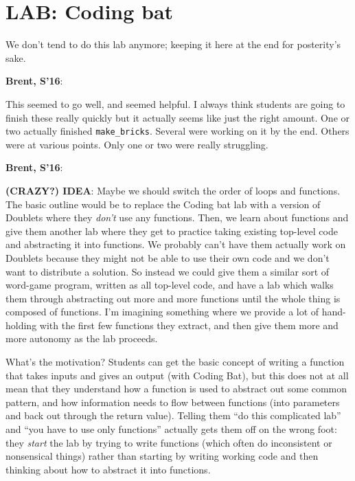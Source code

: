 \documentclass{article}
\newenvironment{reflect}[1]
{
  \noindent
  \begin{lrbox}{\reflectbox}
    \begin{minipage}[t]{\textwidth}
      \textbf{#1}:
}{
    \end{minipage}
  \end{lrbox}
  \fbox{\usebox{\reflectbox}}
}
\begin{document}
\newpage
\section*{LAB: Coding bat}

We don't tend to do this lab anymore; keeping it here at the end for
posterity's sake.

\begin{reflect}{Brent, S'16}
  This seemed to go well, and seemed helpful.  I always think students
  are going to finish these really quickly but it actually seems like
  just the right amount.  One or two actually finished
  \verb|make_bricks|.  Several were working on it by the end.  Others
  were at various points.  Only one or two were really struggling.
\end{reflect}

\noindent
\begin{reflect}{Brent, S'16}
  \textbf{(CRAZY?) IDEA}: Maybe we should switch the order of loops
  and functions.  The basic outline would be to replace the Coding bat
  lab with a version of Doublets where they \emph{don't} use any
  functions.  Then, we learn about functions and give them another lab
  where they get to practice taking existing top-level code and
  abstracting it into functions.  We probably can't have them actually
  work on Doublets because they might not be able to use their own
  code and we don't want to distribute a solution.  So instead we
  could give them a similar sort of word-game program, written as all
  top-level code, and have a lab which walks them through abstracting
  out more and more functions until the whole thing is composed of
  functions.  I'm imagining something where we provide a lot of
  hand-holding with the first few functions they extract, and then
  give them more and more autonomy as the lab proceeds.

  What's the motivation? Students can get the basic concept of writing
  a function that takes inputs and gives an output (with Coding Bat),
  but this does not at all mean that they understand how a function is
  used to abstract out some common pattern, and how information needs
  to flow between functions (into parameters and back out through the
  return value).  Telling them ``do this complicated lab'' and ``you
  have to use only functions'' actually gets them off on the wrong
  foot: they \emph{start} the lab by trying to write functions (which
  often do inconsistent or nonsensical things) rather than starting by
  writing working code and then thinking about how to abstract it into
  functions.
\end{reflect}
\end{document}
